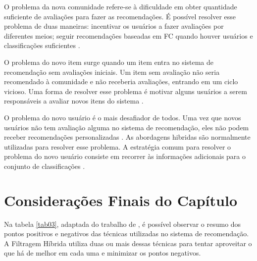 O problema da nova comunidade refere-se à dificuldade em obter quantidade suficiente de avaliações para fazer as recomendações. É possível 
resolver esse problema de duas maneiras: incentivar os usuários a fazer avaliações por diferentes meios; seguir recomendações baseadas em FC 
quando houver usuários e classificações suficientes \cite{bobadilla2013}.

O problema do novo item surge quando um item entra no sistema de recomendação sem avaliações iniciais. 
Um item sem avaliação não seria recomendado à comunidade e não receberia avaliações, entrando em um ciclo vicioso. Uma forma 
de resolver esse problema é motivar alguns usuários a serem responsáveis a avaliar novos itens do sistema \cite{burke2002}. 

O problema do novo usuário é o mais desafiador de todos. Uma vez que novos usuários não tem 
avaliação alguma no sistema de recomendação, eles não podem receber recomendações personalizadas \cite{burke2002}. As abordagens hibridas são normalmente utilizadas para resolver esse problema. 
A estratégia comum para resolver o problema do novo usuário consiste em recorrer às informações adicionais para o conjunto de classificações \cite{bobadilla2013}.

\section{Considerações Finais do Capítulo}

Na tabela \ref{tab03}, adaptada do trabalho de , é possível observar o resumo dos pontos positivos e negativos das técnicas utilizadas no sistema de recomendação.
A Filtragem Híbrida utiliza duas ou mais dessas técnicas para tentar aproveitar o que há de melhor em cada uma e minimizar os pontos negativos.


